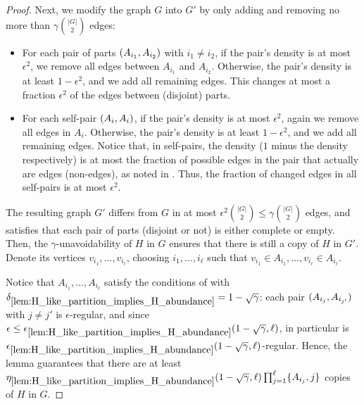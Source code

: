 \begin{theorem}
\begin{proof}
                Next, we modify the graph $G$ into $G'$ by only adding and removing no more than $\gamma {|G| \choose 2}$
                edges:
                \begin{itemize}
                    \item For each pair of parts $( A_{i_1}, A_{i_2} )$ with $i_1 \neq i_2$, if the pair's density is
                        at most $\epsilon^2$, we remove all edges between $A_{i_1}$ and $A_{i_2}$.
                        Otherwise, the pair's density is at least $1 - \epsilon^2$, and we add all remaining edges.
                        This changes at most a fraction $\epsilon^2$ of the edges between (disjoint) parts.
                    \item For each self-pair $( A_i, A_i )$, if the pair's density is at most $\epsilon^2$, again we
                        remove all edges in $A_i$.
                        Otherwise, the pair's density is at least $1 - \epsilon^2$, and we add all remaining edges.
                        Notice that, in self-pairs, the density ($1$ minus the density respectively) is at most
                        the fraction of possible edges in the pair that actually are edges (non-edges), as noted in
                        .
                        Thus, the fraction of changed edges in all self-pairs is at most $\epsilon^2$.
                \end{itemize}
                The resulting graph $G'$ differs from $G$ in at most $\epsilon^2 {|G| \choose 2} \leq \gamma {|G| \choose 2}$
                edges, and satisfies that each pair of parts (disjoint or not) is either complete or empty.
                Then, the $\gamma$-unavoidability of $H$ in $G$ ensures that there is still a copy of $H$ in $G'$.
                Denote its vertices $v_{i_1}, \dots, v_{i_\ell}$, choosing $i_1, \dots, i_\ell$ such that
                $v_{i_1} \in A_{i_1}, \dots, v_{i_\ell} \in A_{i_\ell}$.

                Notice that $A_{i_1}, \dots, A_{i_\ell}$ satisfy the conditions of 
                with $\delta_{\ref{lem:H_like_partition_implies_H_abundance}} = 1 - \sqrt{\gamma}$:
                each pair $( A_{i_j}, A_{i_{j'}} )$ with $j \neq j'$ is $\epsilon$-regular,
                and since $\epsilon \leq \epsilon_{\ref{lem:H_like_partition_implies_H_abundance}} ( 1 - \sqrt{\gamma}, \ell )$,
                in particular is $\epsilon_{\ref{lem:H_like_partition_implies_H_abundance}} ( 1 - \sqrt{\gamma}, \ell )$-regular.
                Hence, the lemma guarantees that there are at least $\eta_{\ref{lem:H_like_partition_implies_H_abundance}}
                    ( 1 - \sqrt{\gamma}, \ell ) \prod_{j=1}^\ell \{ A_{i_j},j \}$
                copies of $H$ in $G$.


\end{proof}
\end{theorem}
